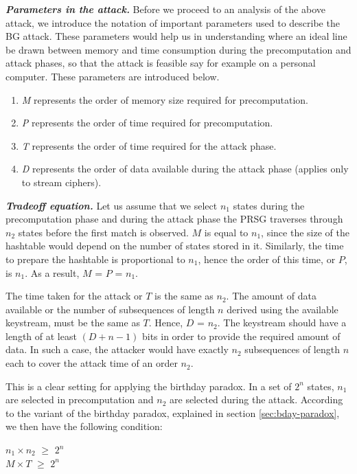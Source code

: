 \indent \textit{\textbf{Parameters in the attack.}} Before we proceed to an analysis of the above attack, we introduce the notation of important parameters used to describe the BG attack. These parameters would help us in understanding where an ideal line be drawn between memory and time consumption during the precomputation and attack phases, so that the attack is feasible say for example on a personal computer. These parameters are introduced below. 

\begin{enumerate}
\item \emph{M} represents the order of memory size required for precomputation.
\item \emph{P} represents the order of time required for precomputation.
\item \emph{T} represents the order of time required for the attack phase.
\item \emph{D} represents the order of data available during the attack phase (applies only to stream ciphers).
\end{enumerate}

\textit{\textbf{Tradeoff equation.}} Let us assume that we select $n_1$ states during the precomputation phase and during the attack phase the PRSG traverses through $n_2$ states before the first match is observed. $M$ is equal to $n_1$, since the size of the hashtable would depend on the number of states stored in it. Similarly, the time to prepare the hashtable is proportional to $n_1$, hence the order of this time, or $P$, is $n_1$. As a result, $M$ = $P$ = $n_1$.

The time taken for the attack or $T$ is the same as $n_2$. The amount of data available or the number of subsequences of length $n$ derived using the available keystream, must be the same as $T$. Hence, $D$ = $n_2$. The keystream should have a length of at least $(D + n - 1)$ bits in order to provide the required amount of data. In such a case, the attacker would have exactly $n_2$ subsequences of length $n$ each to cover the attack time of an order $n_2$.

This is a clear setting for applying the birthday paradox. In a set of $2^n$ states, $n_1$ are selected in precomputation and $n_2$ are selected during the attack. According to the variant of the birthday paradox, explained in section \ref{sec:bday-paradox}, we then have the following condition:

\begin{center}
\large{$n_1 \times n_2$ $\geq$ $2^n$}\\
\large{$M \times T$ $\geq$ $2^n$}\\
\end{center}

